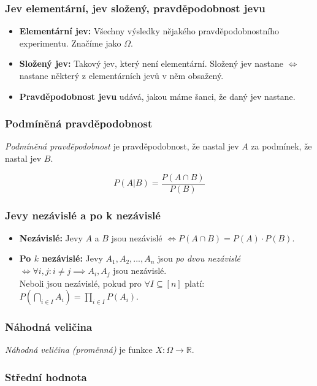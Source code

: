 \documentclass[10pt,a4paper]{article}
\begin{document}
\subsubsection{Jev elementární, jev složený, pravděpodobnost jevu}
\begin{itemize}
    \item \textbf{Elementární jev:} Všechny výsledky nějakého pravděpodobnostního experimentu. Značíme jako $\Omega$.
    \item \textbf{Složený jev:} Takový jev, který není elementární. Složený jev nastane $\iff$ nastane některý z elementárních jevů v něm obsažený.
    \item \textbf{Pravděpodobnost jevu} udává, jakou máme šanci, že daný jev nastane.
\end{itemize}

\subsubsection{Podmíněná pravděpodobnost}

\textit{Podmíněná pravděpodobnost} je pravděpodobnost, že nastal jev $A$ za podmínek, že nastal jev $B$.

\[
    P(A|B) = \frac{P(A \cap B)}{P(B)}
\]


\subsubsection{Jevy nezávislé a po k nezávislé}
\begin{itemize}
    \item \textbf{Nezávislé:} Jevy $A$ a $B$ jsou nezávislé $\iff P(A\cap B) = P(A) \cdot P(B)$.
    \item \textbf{Po $k$ nezávislé:} Jevy $A_1, A_2, ..., A_n$ jsou \textit{po dvou nezávislé} $\iff \forall i,j: i\neq j \implies A_i, A_j$ jsou nezávislé.\\Neboli jsou nezávislé, pokud pro $\forall I \subseteq [n]$ platí: $\displaystyle P\left ( \bigcap_{i\in I} A_i \right ) = \prod_{i\in I} P(A_i)$.
\end{itemize}

\subsubsection{Náhodná veličina}

\textit{Náhodná veličina (proměnná)} je funkce $X: \Omega \to \mathbb{R}$.

\subsubsection{Střední hodnota}
\end{document}
